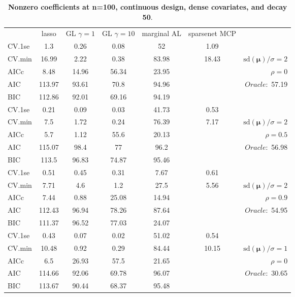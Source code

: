 \clearpage
\begin{table}\vspace{-.5cm}
\caption[l]{ { \bf Nonzero coefficients at n=100, continuous design, 
dense covariates, and  decay  50}.}
\vspace{-.5cm}
\footnotesize{}
\begin{center}
\begin{tabular}{l*{5}{c}|r}
& lasso & GL $\gamma=1$ & GL $\gamma=10$ & marginal AL & sparsenet MCP  & \\
 \cline{1-7}
CV.1se & 1.3 & 0.26 & 0.08 & 52 & 1.09 & \\
CV.min & 16.99 & 2.22 & 0.38 & 83.98 & 18.43 &  $\mathrm{sd}(\mathbf{\mu})/\sigma=2$ \\
AICc & 8.48 & 14.96 & 56.34 & 23.95 & & $\rho=0$ \\
AIC & 113.97 & 93.61 & 70.8 & 94.96 & &  \multirow{2}{*}{$Oracle: $ 57.19} \\
BIC & 112.86 & 92.01 & 69.16 & 94.19 & &  \\
 \hline 
CV.1se & 0.21 & 0.09 & 0.03 & 41.73 & 0.53 & \\
CV.min & 7.5 & 1.72 & 0.24 & 76.39 & 7.17 &  $\mathrm{sd}(\mathbf{\mu})/\sigma=2$ \\
AICc & 5.7 & 1.12 & 55.6 & 20.13 & & $\rho=0.5$ \\
AIC & 115.07 & 98.4 & 77 & 96.2 & &  \multirow{2}{*}{$Oracle: $ 56.98} \\
BIC & 113.5 & 96.83 & 74.87 & 95.46 & &  \\
 \hline 
CV.1se & 0.51 & 0.45 & 0.31 & 7.67 & 0.61 & \\
CV.min & 7.71 & 4.6 & 1.2 & 27.5 & 5.56 &  $\mathrm{sd}(\mathbf{\mu})/\sigma=2$ \\
AICc & 7.44 & 0.88 & 25.08 & 14.94 & & $\rho=0.9$ \\
AIC & 112.43 & 96.94 & 78.26 & 87.64 & &  \multirow{2}{*}{$Oracle: $ 54.95} \\
BIC & 111.37 & 96.52 & 77.03 & 24.07 & &  \\
 \hline 
CV.1se & 0.43 & 0.07 & 0.02 & 51.02 & 0.54 & \\
CV.min & 10.48 & 0.92 & 0.29 & 84.44 & 10.15 &  $\mathrm{sd}(\mathbf{\mu})/\sigma=1$ \\
AICc & 6.5 & 26.93 & 57.5 & 21.65 & & $\rho=0$ \\
AIC & 114.66 & 92.06 & 69.78 & 96.07 & &  \multirow{2}{*}{$Oracle: $ 30.65} \\
BIC & 113.67 & 90.44 & 68.37 & 95.48 & &  \\

\end{tabular}
\end{center}
\end{table}
